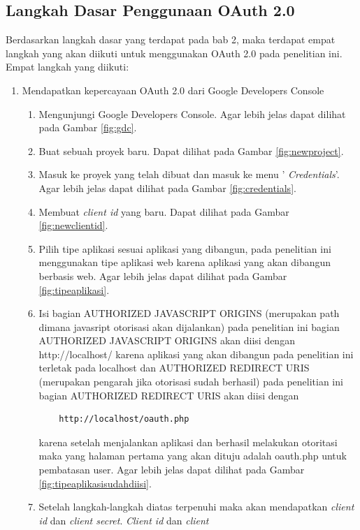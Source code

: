 \subsection{Langkah Dasar Penggunaan OAuth 2.0}
Berdasarkan langkah dasar yang terdapat pada bab 2, maka terdapat empat langkah
yang akan diikuti untuk menggunakan OAuth 2.0 pada penelitian ini. Empat langkah
yang diikuti:
\begin{enumerate}[(1)]
\item Mendapatkan kepercayaan OAuth 2.0 dari Google Developers Console\\
    \begin{enumerate}
    \item Mengunjungi Google Developers Console. Agar lebih jelas dapat dilihat
    pada Gambar \ref{fig:gdc}.
    \item Buat sebuah proyek baru. Dapat dilihat pada Gambar \ref{fig:newproject}.
    \item Masuk ke proyek yang telah dibuat dan masuk ke menu '{\it
    Credentials}'.
    Agar  lebih jelas dapat dilihat pada Gambar \ref{fig:credentials}.
    \item Membuat {\it client id} yang baru. Dapat dilihat pada Gambar
    \ref{fig:newclientid}.
    \item Pilih tipe aplikasi sesuai aplikasi yang dibangun, pada penelitian ini
    menggunakan tipe aplikasi web karena aplikasi yang akan dibangun berbasis
    web. Agar lebih jelas dapat dilihat pada Gambar \ref{fig:tipeaplikasi}.
    \item Isi bagian AUTHORIZED JAVASCRIPT ORIGINS (merupakan path dimana
    javasript otorisasi akan dijalankan) pada penelitian ini bagian AUTHORIZED
    JAVASCRIPT ORIGINS akan diisi dengan http://localhost/ karena aplikasi yang
    akan dibangun pada penelitian ini terletak pada localhost dan AUTHORIZED
    REDIRECT URIS (merupakan pengarah jika otorisasi sudah berhasil) pada
    penelitian ini bagian AUTHORIZED REDIRECT URIS akan diisi dengan
    \begin{lstlisting}
    http://localhost/oauth.php
    \end{lstlisting}
    karena setelah menjalankan aplikasi dan berhasil
    melakukan otoritasi maka yang halaman pertama yang akan dituju adalah
    oauth.php untuk pembatasan user. Agar lebih jelas dapat dilihat pada Gambar
    \ref{fig:tipeaplikasisudahdiisi}.
    \item Setelah langkah-langkah diatas terpenuhi maka akan mendapatkan
    {\it client id} dan {\it client secret}. {\it Client id} dan {\it client
}
\end{enumerate}
\end{enumerate}
